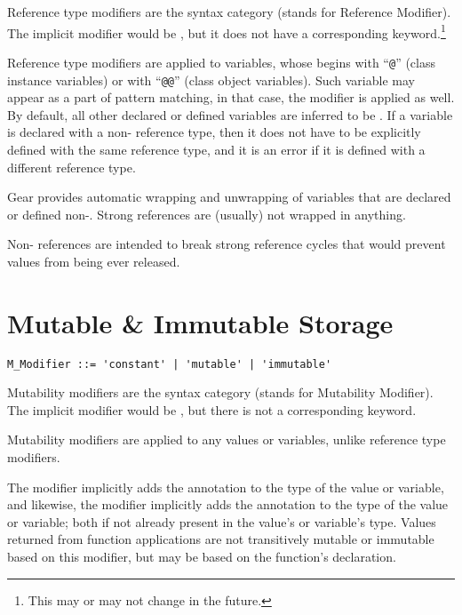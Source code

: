 Reference type modifiers are the syntax category  (stands for Reference Modifier). The implicit modifier would be , but it does not have a corresponding keyword.\footnote{This may or may not change in the future.} 

Reference type modifiers are applied to variables, whose  begins with ``\lstinline!@!'' (class instance variables) or with ``\lstinline!@@!'' (class object variables). Such variable may appear as a part of pattern matching, in that case, the modifier is applied as well. By default, all other declared or defined variables are inferred to be . If a variable is declared with a non- reference type, then it does not have to be explicitly defined with the same reference type, and it is an error if it is defined with a different reference type. 

Gear provides automatic wrapping and unwrapping of variables that are declared or defined non-. Strong references are (usually) not wrapped in anything. 

Non- references are intended to break strong reference cycles that would prevent values from being ever released. 





\section{Mutable \& Immutable Storage}
\label{sec:mutable-immutable-storage}

\syntax\begin{lstlisting}
M_Modifier ::= 'constant' | 'mutable' | 'immutable'
\end{lstlisting}

Mutability modifiers are the syntax category  (stands for Mutability Modifier). The implicit modifier would be , but there is not a corresponding keyword. 

Mutability modifiers are applied to any values or variables, unlike reference type modifiers. 

The  modifier implicitly adds the  annotation to the type of the value or variable, and likewise, the  modifier implicitly adds the  annotation to the type of the value or variable; both if not already present in the value's or variable's type. Values returned from function applications are not transitively mutable or immutable based on this modifier, but may be based on the function's declaration. 

